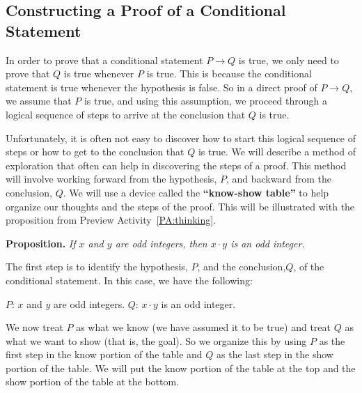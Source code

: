 \subsection*{Constructing a Proof of a Conditional Statement}
In order to prove that a conditional statement $P \to Q$ is true, we only need to prove that  $Q$  is true whenever  $P$  is true.  This is because the conditional statement is true whenever the hypothesis is false.  So in a direct proof of  $P \to Q$, we assume that  $P$  is true, and using this assumption, we proceed through a logical sequence of steps to arrive at the conclusion that  $Q$  is true.  

Unfortunately, it is often not easy to discover how to start this logical sequence of steps or how to get to the conclusion that $Q$  is true.  We will describe a method of exploration that often can help in discovering the steps of a proof.  This method will involve working forward from the hypothesis, $P$, and backward from the conclusion, $Q$.  We will use a device called the \textbf{``know-show table''}
%
 to help organize our thoughts and the steps of the proof.  This will be illustrated with the proposition from Preview Activity~\ref{PA:thinking}.
\begin{flushleft}
\textbf{Proposition.}  \emph{If  $x$  and  $y$  are odd integers, then $ x \cdot y$  is an odd integer.}
\end{flushleft}
The first step is to identify the hypothesis,  $ P$,  and the conclusion,$Q$,  of the conditional statement.  
In this case,  we have the following:
\begin{center}
$P$: $x$ and $y$ are odd integers. \qquad $Q$: $x \cdot y$ is an odd integer.
\end{center}
%
We now treat  $P$  as what we know (we have assumed it to be true) and treat $Q$ as what we want to show (that is, the goal).  So we organize this by using  $P$  as the first step in the know portion of the table and  $Q$  as the last step in the show portion of the table.  We will put the know portion of the table at the top and the show portion of the table at the bottom.
